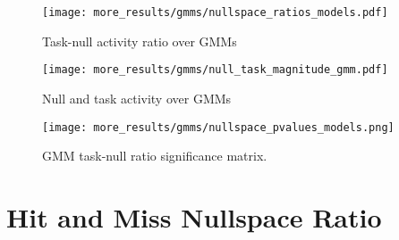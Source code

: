 \documentclass[../main.tex]{subfiles}
\begin{document}
\begin{figure}[tph]
  \centering
  \texttt{[image: more\_results/gmms/nullspace\_ratios\_models.pdf]}
  \caption[Task-null activity ratio over GMMs]{Task-null activity ratio over GMMs}\label{fig:nullspace_gmms}
\end{figure}

\begin{figure}[tph]
  \centering
  \texttt{[image: more\_results/gmms/null\_task\_magnitude\_gmm.pdf]}
  \caption[Null and task activity over GMMs]{Null and task activity over GMMs}\label{fig:null_task_magnitude_gmms}
\end{figure}

\begin{figure}[tph]
  \centering
  \texttt{[image: more\_results/gmms/nullspace\_pvalues\_models.png]}
  \caption[GMM task-null ratio significance matrix]{GMM task-null ratio significance matrix.}\label{fig:nullspace_pvalues_gmms}
\end{figure}



\section{Hit and Miss Nullspace Ratio}
\end{document}
